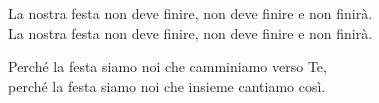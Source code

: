

\spazio

La nostra festa non deve finire, non deve finire e non finirà.\\
La nostra festa non deve finire, non deve finire e non finirà.

\spazio

Perché la festa siamo noi che camminiamo verso Te,\\
perché la festa siamo noi che insieme cantiamo così.

\spazio

